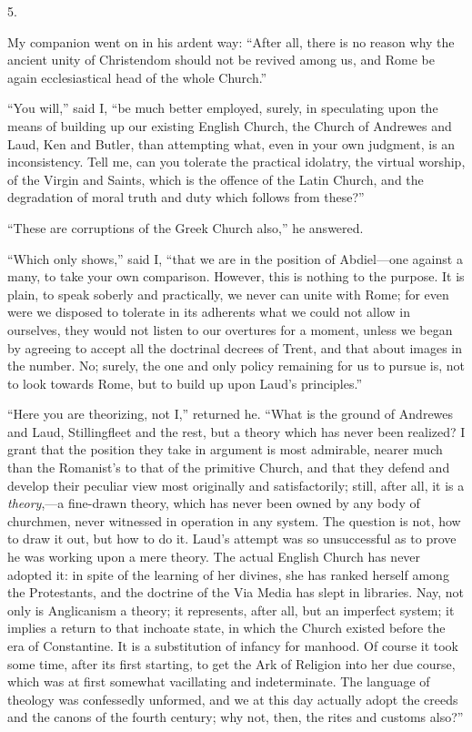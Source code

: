 5.

My companion went on in his ardent way: ``After
all, there is no reason why the ancient unity of Christendom should
not be revived among us, and Rome be again ecclesiastical head of the
whole Church.''

``You will,'' said I, ``be much better employed,
surely, in speculating upon the means of building up our existing
English Church, the Church of Andrewes and Laud, Ken and Butler, than
attempting what, even in your own judgment, is an inconsistency. Tell
me, can you tolerate the practical idolatry, the virtual worship, of
the Virgin and Saints, which is the offence of the Latin Church, and
the degradation of moral truth and duty which follows from these?''

``These are corruptions of the Greek Church also,''
he answered.

``Which only shows,'' said I, ``that we are in the
position of Abdiel—one against a many, to take your own comparison.
However, this is nothing to the purpose. It is plain, to speak soberly
and practically, we never can unite with Rome; for even were we
disposed to tolerate in its adherents what we could not allow in
ourselves, they would not listen to our overtures for a moment, unless
we began by agreeing to accept all the doctrinal decrees of Trent, and
that about images in the number. No; surely, the one and only policy
remaining for us to pursue is, not to look towards Rome, but to build
up upon Laud's principles.''

``Here you are theorizing, not I,'' returned he. ``What
is the ground of Andrewes and Laud, Stillingfleet and the rest, but a
theory which has never been realized? I grant that the position they
take in argument is most admirable, nearer much than the Romanist's to
that of the primitive Church, and that they defend and develop
their peculiar view most originally and satisfactorily; still, after
all, it is a \emph{theory},—a fine-drawn theory, which has never
been owned by any body of churchmen, never witnessed in operation in
any system. The question is not, how to draw it out, but how to do it.
Laud's attempt was so unsuccessful as to prove he was working upon a
mere theory. The actual English Church has never adopted it: in spite
of the learning of her divines, she has ranked herself among the
Protestants, and the doctrine of the Via Media has slept in libraries.
Nay, not only is Anglicanism a theory; it represents, after all, but
an imperfect system; it implies a return to that inchoate state, in
which the Church existed before the era of Constantine. It is a
substitution of infancy for manhood. Of course it took some time,
after its first starting, to get the Ark of Religion into her due
course, which was at first somewhat vacillating and indeterminate. The
language of theology was confessedly unformed, and we at this day
actually adopt the creeds and the canons of the fourth century; why
not, then, the rites and customs also?''

